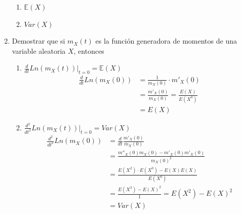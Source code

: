 \documentclass[12pt,a4paper]{report}
\begin{document}
\begin{enumerate}
{\begin{enumerate}
				\item {
					$\mathbb{E}(X)$
				}

				\item {
					$Var(X)$
				}
			\end{enumerate}
		}

		\item{
			Demostrar que si $m_X(t)$ es la función generadora de momentos de
			una variable aleatoria $X$, entonces
			\begin{enumerate}
				\item {
				$\frac{d}{dt}Ln(m_X(t))|_{t = 0} = \mathbb{E}(X)$
				\begin{align*}
					\frac{d}{dt}Ln(m_X(0)) &= \frac{1}{m_X(0)} \cdot m'_X(0)\\
					&= \frac{m'_X(0)}{m_X(0)} = \frac{E(X)}{E(X^0)}\\
					&= E(X)
				\end{align*}
				}

				\item {
				$\frac{d^2}{dt^2}Ln(m_X(t))|_{t = 0} = Var(X)$
				\begin{align*}
					\frac{d^2}{dt^2}Ln(m_X(0)) &= \frac{d}{dt}\frac{m'_X(0)}{m_X(0)}\\
					&= \frac{m''_X(0)m_X(0)-m'_X(0)m'_X(0)}{m_X(0)^2}\\
					&= \frac{E(X^2) \cdot E(X^0) - E(X)E(X)}{E(X^0)}\\
					&= \frac{E(X^2)-E(X)^2}{1} = E(X^2)-E(X)^2 \\
					&= Var(X)
				\end{align*}
				}
			\end{enumerate}
		}


\end{enumerate}
\end{document}
